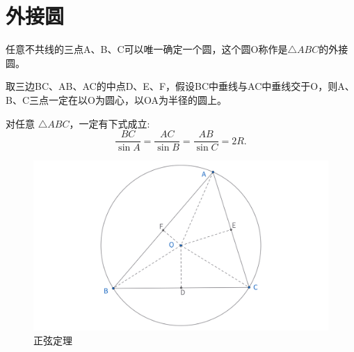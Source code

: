\section{外接圆}
\begin{definition}
任意不共线的三点A、B、C可以唯一确定一个圆，这个圆O称作是$\triangle ABC$的外接圆。

取三边BC、AB、AC的中点D、E、F，假设BC中垂线与AC中垂线交于O，则A、B、C三点一定在以O为圆心，以OA为半径的圆上。    
\end{definition}

\begin{theorem}
    对任意 $\triangle ABC$，一定有下式成立:
    $$\frac{BC}{\sin A} = \frac{AC}{\sin B} = \frac{AB}{\sin C}=2R.$$
\end{theorem}
\begin{figure}[H]
    \centering
    \includegraphics[width=\linewidth]{figures/正弦定理.png}
    \caption{正弦定理}
\end{figure}



